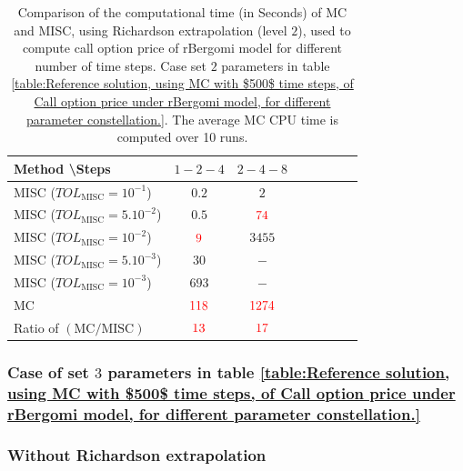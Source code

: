 \begin{table}[!h]
	\centering
	\begin{tabular}{l*{6}{c}r}
		Method \textbackslash  Steps            & $1-2-4$ & $2-4-8$   \\
		\hline
		MISC ($TOL_{\text{MISC}}=10^{-1}$)  & $0.2$ & $2$ &   \\
		MISC ($TOL_{\text{MISC}}=5.10^{-2}$)  & $0.5$ & ${\color{red}74}$  \\
		MISC ($TOL_{\text{MISC}}=10^{-2}$)  & ${\color{red}9}$ & $3455$   \\
		MISC ($TOL_{\text{MISC}}=5.10^{-3}$)  & $30$ & $-$  \\	
		MISC ($TOL_{\text{MISC}}=10^{-3}$)  & $693$ & $-$  \\	
		\hline
		MC    & $ {\color{red}  118}$  & ${\color{red}1274}$  \\
		
		\hline
		Ratio of $\left(\text{MC}/ \text{MISC} \right)$  &${\color{red}13}$ & ${\color{red}  17}$   \\
		\hline
	\end{tabular}
	\caption{Comparison of the computational time (in Seconds) of  MC and MISC, using Richardson extrapolation (level $2$), used to compute call option price of rBergomi model for different number of time steps. Case set $2$ parameters in table \ref{table:Reference solution, using MC with $500$ time steps, of Call option price under rBergomi model, for different parameter constellation.}. The
		average MC CPU time is computed over 10 runs.}
	\label{Comparsion of the computational time of  MC and MISC, using Richardson extrapolation (level $2$), used to compute Call option price of rBergomi model for different number of time steps. Case set $2$ parameters,linear}
\end{table}





\FloatBarrier

\subsubsection{Case of set $3$ parameters in table \ref{table:Reference solution, using MC with $500$ time steps, of Call option price under rBergomi model, for different parameter constellation.}}\label{sec:Case of set 3 parameters}


\subsubsection*{Without Richardson extrapolation}

